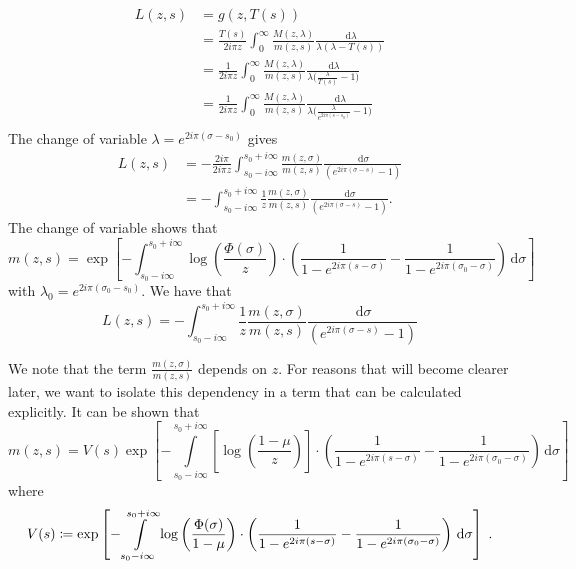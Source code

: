 \documentclass[11pt]{amsart}
\newcommand{\diff}{\,\mathrm{d}}
\begin{document}
\begin{align*}
    L(z,s) &= g(z,T(s)) \\ 
    &= 
    \frac{T(s)}{2i \pi z}\int_0^\infty  \frac{M(z,\lambda)}{m(z,s)} \frac{\diff \lambda}{\lambda(\lambda-T(s))} \\
    &= 
    \frac{1}{2i\pi z}\int_0^\infty  \frac{M(z,\lambda)}{m(z,s)} \frac{\diff \lambda}{\lambda\Big(\frac{\lambda}{T(s)}-1\Big)} \\
    &= 
    \frac{1}{2i\pi z}\int_0^\infty  \frac{M(z,\lambda)}{m(z,s)} \frac{\diff \lambda}{\lambda\Big(\frac{\lambda}{e^{2i\pi(s-s_0)}}-1\Big)} \\
\end{align*}
The change of variable $\lambda = e^{2i\pi(\sigma-s_0)}$ gives
\begin{align*}
    L(z,s)
    &= 
    - \frac{2i\pi }{2i\pi z}\int_{s_0-i\infty}^{s_0+i\infty}  \frac{m(z,\sigma)}{m(z,s)} \frac{\diff \sigma}{(e^{2i\pi(\sigma-s)}-1)} \\
    &= 
   - \int_{s_0-i\infty}^{s_0+i\infty} \frac{1}{z}  \frac{m(z,\sigma)}{m(z,s)} \frac{\diff \sigma}{(e^{2i\pi(\sigma-s)}-1)}. 
\end{align*}
The change of variable shows that
\begin{equation}
    m(z,s) = \exp \left[
    - \int_{s_0-i\infty}^{s_0+i\infty}\log \left( \frac{\Phi(
    \sigma)}{z}\right)
    \cdot \left(
        \frac{1}{1-e^{2i\pi(s-\sigma)}} - \frac{1}{1-e^{2i\pi(\sigma_0-\sigma)}}
     \right) \diff \sigma
    \right]
\end{equation} 
with $\lambda_0 = e^{2i\pi(\sigma_0 - s_0)}$. 
We have that 
\begin{equation}
    L(z,s) 
    = 
   - \int_{s_0-i\infty}^{s_0+i\infty} \frac{1}{z}  \frac{m(z,\sigma)}{m(z,s)} \frac{\diff \sigma}{(e^{2i\pi(\sigma-s)}-1)}
\end{equation}

We note that the term $\frac{m(z,\sigma)}{m(z,s)}$ depends on $z$. For reasons that will become clearer later, we want to isolate this dependency in a term that can be calculated explicitly. 
It can be shown that 
\begin{equation}
    m(z,s) = V(s)
    \exp \left[
    - \int\limits_{s_0-i\infty}^{s_0+i\infty} \left[\log \left( \frac{1-\mu}{z}\right)\right]
    \cdot \left(
        \frac{1}{1-e^{2i\pi(s-\sigma)}} - \frac{1}{1-e^{2i\pi(\sigma_0-\sigma)}}
     \right) \diff \sigma
    \right]
    \label{eq:uselogbranch}
\end{equation}
where 
\begin{equation*}
V(s) \coloneqq \exp \left[
    - \int\limits_{s_0-i\infty}^{s_0+i\infty}\log \left( \frac{\Phi(\sigma)}{1-\mu}\right)
    \cdot \left(
        \frac{1}{1-e^{2i\pi(s-\sigma)}} - \frac{1}{1-e^{2i\pi(\sigma_0-\sigma)}}
     \right) \diff \sigma 
    \right]
    \eqfinp
\end{equation*}
\end{document}
